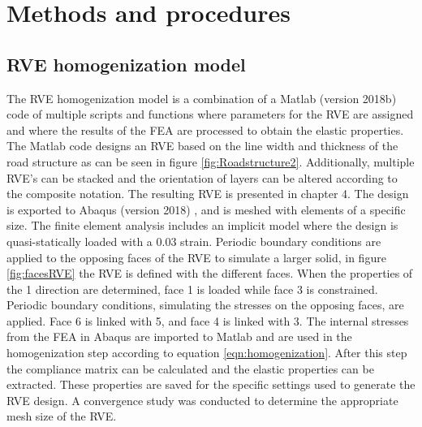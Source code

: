 \section{Methods and procedures}
\subsection{RVE homogenization model}
The RVE homogenization model is a combination of a Matlab (version 2018b) code of multiple scripts and functions where parameters for the RVE are assigned and where the results of the FEA are processed to obtain the elastic properties. The Matlab code designs an RVE based on the line width and thickness of the road structure as can be seen in figure \ref{fig:Roadstructure2}. Additionally, multiple RVE's can be stacked and the orientation of  layers can be altered according to the composite notation. The resulting RVE is presented in chapter 4. The design is exported to Abaqus (version 2018) , and is meshed with elements of a specific size. 
The finite element analysis includes an implicit model where the design is quasi-statically loaded with a 0.03 strain. Periodic boundary conditions are applied to the opposing faces of the RVE to simulate a larger solid, in figure \ref{fig:facesRVE} the RVE is defined with the different faces. When the properties of the 1 direction are determined, face 1 is loaded while face 3 is constrained. Periodic boundary conditions, simulating the stresses on the opposing faces, are applied. Face 6 is linked with 5, and face 4 is linked with 3. 
The internal stresses from the FEA in Abaqus are imported to Matlab and are used in the homogenization step according to equation \ref{eqn:homogenization}. After this step the compliance matrix can be calculated and the elastic properties can be extracted. These properties are saved for the specific settings used to generate the RVE design. 
A convergence study was conducted to determine the appropriate mesh size of the RVE. 

